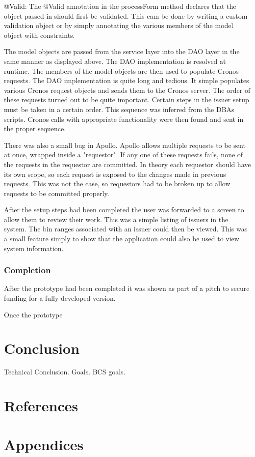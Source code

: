 \documentclass[a4paper, 11pt, titlepage]{article}
\begin{document}
@Valid: The @Valid annotation in the processForm method declares that the object passed in should first be validated. This cam be done by writing a custom validation object or by simply annotating the various members of the model object with constraints.

The model objects are passed from the service layer into the DAO layer in the same manner as displayed above. The DAO implementation is resolved at runtime. The members of the model objects are then used to populate Cronos requests. The DAO implementation is quite long and tedious. It simple populates various Cronos request objects and sends them to the Cronos server. The order of these requests turned out to be quite important. Certain steps in the issuer setup must be taken in a certain order. This sequence was inferred from the DBAs scripts. Cronos calls with appropriate functionality were then found and sent in the proper sequence. 

There was also a small bug in Apollo. Apollo allows multiple requests to be sent at once, wrapped inside a "requestor". If any one of these requests fails, none of the requests in the requestor are committed. In theory each requestor should have its own scope, so each request is exposed to the changes made in previous requests. This was not the case, so requestors had to be broken up to allow requests to be committed properly.

After the setup steps had been completed the user was forwarded to a screen to allow them to review their work. This was a simple listing of issuers in the system. The bin ranges associated with an issuer could then be viewed. This was a small feature simply to show that the application could also be used to view system information.

\subsubsection{Completion}

After the prototype had been completed it was shown as part of a pitch to secure funding for a fully developed version. 

Once the prototype



\section{Conclusion}
Technical Conclusion. Goals. BCS goals.
\section{References}

\section{Appendices}
\end{document}
